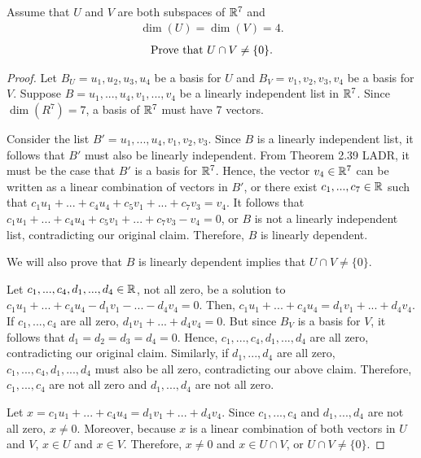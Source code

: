 \begin{question}
	\normalfont
	
	Assume that $U$ and $V$ are both subspaces of ${\mathbb R}^7$ and 
	\begin{align*}
		\dim(U)=\dim(V)=4.
	\end{align*} 
	\begin{align}\label{eq:UIntersectVStatement}
		\text{Prove that}\  U\cap V \not= \{0\}. 
	\end{align}
\end{question}

\begin{proof}
    \renewcommand{\qedsymbol}{$\blacksquare$}
    Let $B_U=u_1,u_2,u_3,u_4$ be a basis for $U$ and $B_V=v_1,v_2,v_3,v_4$ be a basis for $V$.
    Suppose $B=u_1,...,u_4,v_1,...,v_4$ be a linearly independent list in $\mathbb R^7$. Since $\dim(R^7)=7$, a basis of $\mathbb R^7$ must have 7 vectors.

    Consider the list $B'=u_1,...,u_4,v_1,v_2,v_3$. Since $B$ is a linearly independent list, it follows that $B'$ must also be linearly independent. 
    From Theorem 2.39 LADR, it must be the case that $B'$ is a basis for $\mathbb R^7$.
    Hence, the vector $v_4\in\mathbb R^7$ can be written as a linear combination of vectors in $B'$, or there exist $c_1,...,c_7\in\mathbb R$ such that $c_1u_1+...+c_4u_4+c_5v_1+...+c_7v_3=v_4$.
    It follows that $c_1u_1+...+c_4u_4+c_5v_1+...+c_7v_3-v_4=0$, or $B$ is not a linearly independent list, contradicting our original claim.
    Therefore, $B$ is linearly dependent.

    We will also prove that $B$ is linearly dependent implies that $U\cap V\not=\{0\}$.

    Let $c_1,...,c_4,d_1,...,d_4\in\mathbb R$, not all zero, be a solution to $c_1u_1+...+c_4u_4-d_1v_1-...-d_4v_4=0$.
    Then, $c_1u_1+...+c_4u_4=d_1v_1+...+d_4v_4$.
    If $c_1,...,c_4$ are all zero, $d_1v_1+...+d_4v_4=0$.
    But since $B_V$ is a basis for $V$, it follows that $d_1=d_2=d_3=d_4=0$.
    Hence, $c_1,...,c_4,d_1,...,d_4$ are all zero, contradicting our original claim.
    Similarly, if $d_1,...,d_4$ are all zero, $c_1,...,c_4,d_1,...,d_4$ must also be all zero, contradicting our above claim.
    Therefore, $c_1,...,c_4$ are not all zero and $d_1,...,d_4$ are not all zero.
    
    Let $x=c_1u_1+...+c_4u_4=d_1v_1+...+d_4v_4$.
    Since $c_1,...,c_4$ and $d_1,...,d_4$ are not all zero, $x\not=0$.
    Moreover, because $x$ is a linear combination of both vectors in $U$ and $V$, $x\in U$ and $x\in V$.
    Therefore, $x\not=0$ and $x\in U\cap V$, or $U\cap V\not=\{0\}$.
\end{proof}